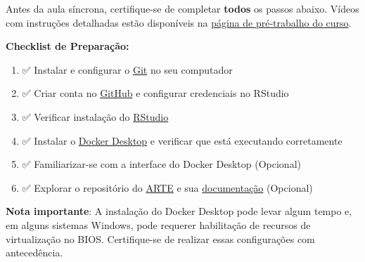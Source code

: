 \documentclass[
  a4paper,
]{book}
\providecommand{\tightlist}{%
  \setlength{\itemsep}{0pt}\setlength{\parskip}{0pt}}\usepackage{longtable,booktabs,array}
\newcommand{\emojitext}[1]{{\emoji #1}}
\begin{document}
\begin{tcolorbox}[enhanced jigsaw, colback=white, toptitle=1mm, opacityback=0, left=2mm, rightrule=.15mm, title=\textcolor{quarto-callout-important-color}{\faExclamation}\hspace{0.5em}{Pré-requisitos}, coltitle=black, opacitybacktitle=0.6, breakable, toprule=.15mm, bottomtitle=1mm, titlerule=0mm, bottomrule=.15mm, arc=.35mm, leftrule=.75mm, colframe=quarto-callout-important-color-frame, colbacktitle=quarto-callout-important-color!10!white]

Antes da aula síncrona, certifique-se de completar \textbf{todos} os
passos abaixo. Vídeos com instruções detalhadas estão disponíveis na
\hyperref[sec-dockerprework]{página de pré-trabalho do curso}.

\vspace{10pt}

\textbf{Checklist de Preparação:}

\vspace{10pt}

\begin{enumerate}
\def\labelenumi{\arabic{enumi}.}
\tightlist
\item
  \emojitext{✅} Instalar e configurar o
  \href{https://git-scm.com/}{Git} no seu computador
\item
  \emojitext{✅} Criar conta no \href{https://github.com/}{GitHub} e
  configurar credenciais no RStudio
\item
  \emojitext{✅} Verificar instalação do
  \href{https://posit.co/download/rstudio-desktop/}{RStudio}
\item
  \emojitext{✅} Instalar o
  \href{https://www.docker.com/products/docker-desktop}{Docker Desktop}
  e verificar que está executando corretamente
\item
  \emojitext{✅} Familiarizar-se com a interface do Docker Desktop
  (Opcional)
\item
  \emojitext{✅} Explorar o repositório do
  \href{https://github.com/phdpablo/article-template}{ARTE} e sua
  \href{https://phdpablo.github.io/article-template/}{documentação}
  (Opcional)
\end{enumerate}

\vspace{10pt}

\textbf{Nota importante}: A instalação do Docker Desktop pode levar
algum tempo e, em alguns sistemas Windows, pode requerer habilitação de
recursos de virtualização no BIOS. Certifique-se de realizar essas
configurações com antecedência.

\end{tcolorbox}
\end{document}
